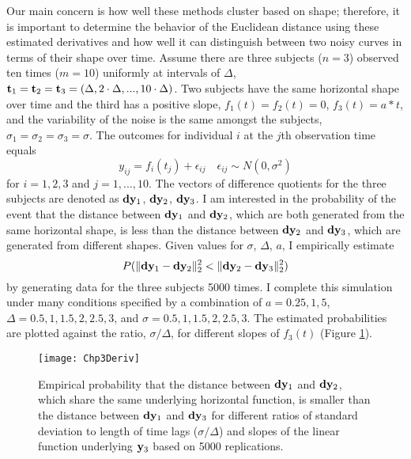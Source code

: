 Our main concern is how well these methods cluster based on shape; therefore, it is important to determine the behavior of the Euclidean distance using these estimated derivatives and how well it can distinguish between two noisy curves in terms of their shape over time. Assume there are three subjects ($n=3$) observed ten times ($m=10$) uniformly at intervals of $\Delta$, $\mathbf t_1 = \mathbf t_2=\mathbf t_3 = (\Delta,2\cdot\Delta,...,10\cdot\Delta)$. Two subjects have the same horizontal shape over time and the third has a positive slope, $f_1(t) = f_2(t) =0$, $f_3(t)=a*t$, and the variability of the noise is the same amongst the subjects, $\sigma_1=\sigma_2=\sigma_3=\sigma$. The outcomes for individual $i$ at the $j$th observation time equals
$$y_{ij}=f_{i}(t_{j})+\epsilon_{ij}\quad \epsilon_{ij}\sim N(0,\sigma^{2})$$
for $i=1,2,3$ and $j=1,...,10$. The vectors of difference quotients for the three subjects are denoted as $\mathbf d\mathbf y_1$, $\mathbf d\mathbf y_2$, $\mathbf d\mathbf y_3$. I am interested in the probability of the event that the distance between $\mathbf d\mathbf y_1$ and $\mathbf d\mathbf y_2$, which are both generated from the same horizontal shape, is less than the distance between $\mathbf d\mathbf y_2$ and $\mathbf d\mathbf y_3$, which are generated from different shapes. Given values for $\sigma$, $\Delta$, $a$, I empirically estimate
$$P(\|\mathbf d\mathbf y_1-\mathbf d\mathbf y_2\|^2_2 < \|\mathbf d\mathbf y_2-\mathbf d\mathbf y_3\|^{2}_{2})$$
by generating data for the three subjects 5000 times. I complete this simulation under many conditions specified by a combination of $a = 0.25, 1, 5$, $\Delta = 0.5,1,1.5,2,2.5,3$, and $\sigma = 0.5,1,1.5,2,2.5,3$. The estimated probabilities are plotted against the ratio, $\sigma/\Delta$, for different slopes of $f_{3}(t)$ (Figure \ref{fig:3-3}). 

\begin{figure}[ht]
\centering
\texttt{[image: Chp3Deriv]}
\caption{Empirical probability that the distance between $\mathbf d\mathbf y_{1}$ and $\mathbf d\mathbf y_{2}$, which share the same underlying horizontal function, is smaller than the distance between $\mathbf d\mathbf y_{1}$ and $\mathbf d\mathbf y_{3}$ for different ratios of standard deviation to length of time lags ($\sigma/\Delta$) and slopes of the linear function underlying $\mathbf y_{3}$ based on 5000 replications.}
\label{fig:3-3} 
\end{figure}

